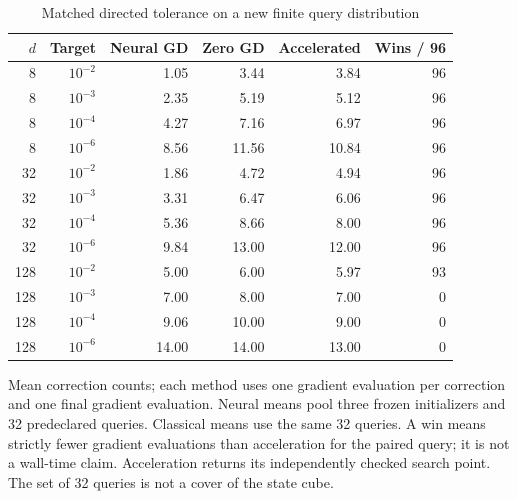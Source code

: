 \begin{table}[htbp]
\centering\small
\caption{Matched directed tolerance on a new finite query distribution}\label{tab:r19warm}
\begin{tabular}{rrrrrr}\toprule
$d$ & Target & Neural GD & Zero GD & Accelerated & Wins / 96\\
\midrule
8 & $10^{-2}$ & 1.05 & 3.44 & 3.84 & 96\\
8 & $10^{-3}$ & 2.35 & 5.19 & 5.12 & 96\\
8 & $10^{-4}$ & 4.27 & 7.16 & 6.97 & 96\\
8 & $10^{-6}$ & 8.56 & 11.56 & 10.84 & 96\\
32 & $10^{-2}$ & 1.86 & 4.72 & 4.94 & 96\\
32 & $10^{-3}$ & 3.31 & 6.47 & 6.06 & 96\\
32 & $10^{-4}$ & 5.36 & 8.66 & 8.00 & 96\\
32 & $10^{-6}$ & 9.84 & 13.00 & 12.00 & 96\\
128 & $10^{-2}$ & 5.00 & 6.00 & 5.97 & 93\\
128 & $10^{-3}$ & 7.00 & 8.00 & 7.00 & 0\\
128 & $10^{-4}$ & 9.06 & 10.00 & 9.00 & 0\\
128 & $10^{-6}$ & 14.00 & 14.00 & 13.00 & 0\\
\bottomrule
\end{tabular}
\par\smallskip\begin{minipage}{.98\textwidth}\footnotesize Mean correction counts; each method uses one gradient evaluation per correction and one final gradient evaluation. Neural means pool three frozen initializers and 32 predeclared queries. Classical means use the same 32 queries. A win means strictly fewer gradient evaluations than acceleration for the paired query; it is not a wall-time claim. Acceleration returns its independently checked search point. The set of 32 queries is not a cover of the state cube.\end{minipage}
\end{table}
